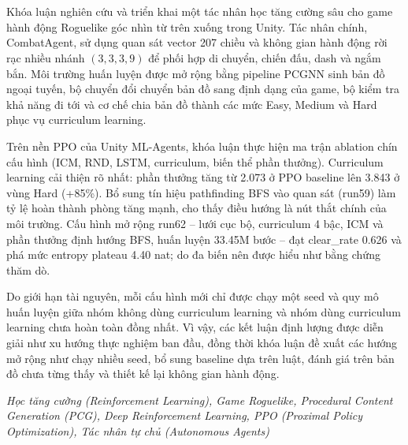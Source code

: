\clearpage
{}

\chapter*{\fontsize{13}{13}\selectfont{Tóm tắt}}

Khóa luận nghiên cứu và triển khai một tác nhân học tăng cường sâu cho game hành động Roguelike góc nhìn từ trên xuống trong Unity. Tác nhân chính, CombatAgent, sử dụng quan sát vector 207 chiều và không gian hành động rời rạc nhiều nhánh $(3,3,3,9)$ để phối hợp di chuyển, chiến đấu, dash và ngắm bắn. Môi trường huấn luyện được mở rộng bằng pipeline PCGNN sinh bản đồ ngoại tuyến, bộ chuyển đổi chuyển bản đồ sang định dạng của game, bộ kiểm tra khả năng đi tới và cơ chế chia bản đồ thành các mức Easy, Medium và Hard phục vụ curriculum learning.

Trên nền PPO của Unity ML-Agents, khóa luận thực hiện ma trận ablation chín cấu hình (ICM, RND, LSTM, curriculum, biến thể phần thưởng). Curriculum learning cải thiện rõ nhất: phần thưởng tăng từ 2.073 ở PPO baseline lên 3.843 ở vùng Hard (+85\%). Bổ sung tín hiệu pathfinding BFS vào quan sát (run59) làm tỷ lệ hoàn thành phòng tăng mạnh, cho thấy điều hướng là nút thắt chính của môi trường. Cấu hình mở rộng run62 -- lưới cục bộ, curriculum 4 bậc, ICM và phần thưởng định hướng BFS, huấn luyện 33.45M bước -- đạt clear\_rate 0.626 và phá mức entropy plateau 4.40 nat; do đa biến nên được hiểu như bằng chứng thăm dò.

Do giới hạn tài nguyên, mỗi cấu hình mới chỉ được chạy một seed và quy mô huấn luyện giữa nhóm không dùng curriculum learning và nhóm dùng curriculum learning chưa hoàn toàn đồng nhất. Vì vậy, các kết luận định lượng được diễn giải như xu hướng thực nghiệm ban đầu, đồng thời khóa luận đề xuất các hướng mở rộng như chạy nhiều seed, bổ sung baseline dựa trên luật, đánh giá trên bản đồ chưa từng thấy và thiết kế lại không gian hành động.

\vspace{0.5cm}
 \textit{Học tăng cường (Reinforcement Learning), Game Roguelike, Procedural Content Generation (PCG), Deep Reinforcement Learning, PPO (Proximal Policy Optimization), Tác nhân tự chủ (Autonomous Agents)}
